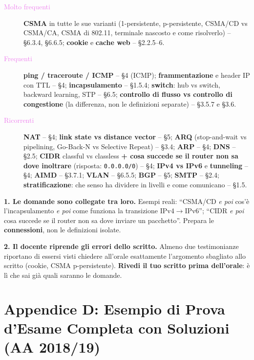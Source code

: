 \documentclass[12pt, a4paper]{article}
\begin{document}
\begin{description}
    \item[\textcolor{violet}{Molto frequenti}] \textbf{CSMA} in tutte le sue varianti (1-persistente, p-persistente, CSMA/CD vs CSMA/CA, CSMA di 802.11, terminale nascosto e come risolverlo) -- \S6.3.4, \S6.6.5; \textbf{cookie} e \textbf{cache web} -- \S2.2.5--6.
    \item[\textcolor{violet}{Frequenti}] \textbf{ping / traceroute / ICMP} -- \S4 (ICMP); \textbf{frammentazione} e header IP con TTL -- \S4; \textbf{incapsulamento} -- \S1.5.4; \textbf{switch}: hub vs switch, backward learning, STP -- \S6.5; \textbf{controllo di flusso vs controllo di congestione} (la differenza, non le definizioni separate) -- \S3.5.7 e \S3.6.
    \item[\textcolor{violet}{Ricorrenti}] \textbf{NAT} -- \S4; \textbf{link state vs distance vector} -- \S5; \textbf{ARQ} (stop-and-wait vs pipelining, Go-Back-N vs Selective Repeat) -- \S3.4; \textbf{ARP} -- \S4; \textbf{DNS} -- \S2.5; \textbf{CIDR} classful vs classless \textbf{+ cosa succede se il router non sa dove inoltrare} (risposta: \texttt{0.0.0.0/0}) -- \S4; \textbf{IPv4 vs IPv6} e \textbf{tunneling} -- \S4; \textbf{AIMD} -- \S3.7.1; \textbf{VLAN} -- \S6.5.5; \textbf{BGP} -- \S5; \textbf{SMTP} -- \S2.4; \textbf{stratificazione}: che senso ha dividere in livelli e come comunicano -- \S1.5.
\end{description}

\begin{tcolorbox}[colback=cyan!5, colframe=blue!40!black, title=\textbf{Due pattern da conoscere}]
\textbf{1. Le domande sono collegate tra loro.} Esempi reali: ``CSMA/CD \emph{e poi} cos'è l'incapsulamento \emph{e poi} come funziona la transizione IPv4$\to$IPv6''; ``CIDR \emph{e poi} cosa succede se il router non sa dove inviare un pacchetto''. Prepara le \textbf{connessioni}, non le definizioni isolate.

\textbf{2. Il docente riprende gli errori dello scritto.} Almeno due testimonianze riportano di essersi visti chiedere all'orale esattamente l'argomento sbagliato allo scritto (cookie, CSMA p-persistente). \textbf{Rivedi il tuo scritto prima dell'orale}: è lì che sai già quali saranno le domande.
\end{tcolorbox}

\section{Appendice D: Esempio di Prova d'Esame Completa con Soluzioni (AA 2018/19)}
\end{document}
